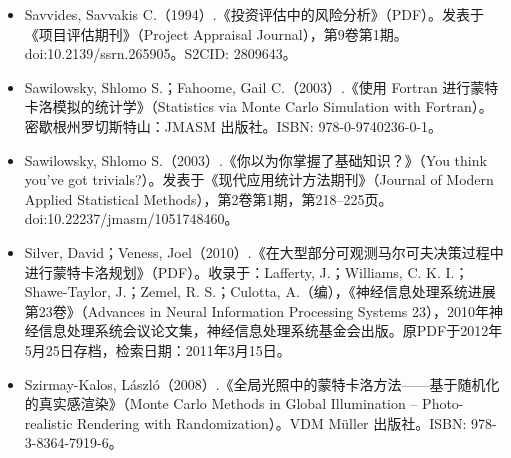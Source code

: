 \begin{itemize}
\item Savvides, Savvakis C.（1994）.《投资评估中的风险分析》（PDF）。发表于《项目评估期刊》（Project Appraisal Journal），第9卷第1期。doi:10.2139/ssrn.265905。S2CID: 2809643。
\item Sawilowsky, Shlomo S.；Fahoome, Gail C.（2003）.《使用 Fortran 进行蒙特卡洛模拟的统计学》（Statistics via Monte Carlo Simulation with Fortran）。密歇根州罗切斯特山：JMASM 出版社。ISBN: 978-0-9740236-0-1。
\item Sawilowsky, Shlomo S.（2003）.《你以为你掌握了基础知识？》（You think you've got trivials?）。发表于《现代应用统计方法期刊》（Journal of Modern Applied Statistical Methods），第2卷第1期，第218–225页。doi:10.22237/jmasm/1051748460。
\item Silver, David；Veness, Joel（2010）.《在大型部分可观测马尔可夫决策过程中进行蒙特卡洛规划》（PDF）。收录于：Lafferty, J.；Williams, C. K. I.；Shawe-Taylor, J.；Zemel, R. S.；Culotta, A.（编），《神经信息处理系统进展第23卷》（Advances in Neural Information Processing Systems 23），2010年神经信息处理系统会议论文集，神经信息处理系统基金会出版。原PDF于2012年5月25日存档，检索日期：2011年3月15日。
\item Szirmay-Kalos, László（2008）.《全局光照中的蒙特卡洛方法——基于随机化的真实感渲染》（Monte Carlo Methods in Global Illumination – Photo-realistic Rendering with Randomization）。VDM Müller 出版社。ISBN: 978-3-8364-7919-6。
\end{itemize}
